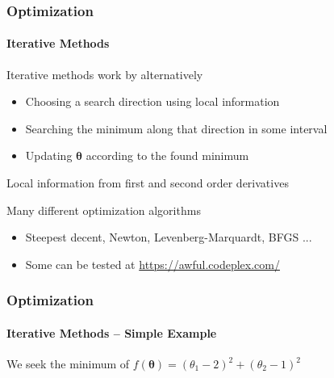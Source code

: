 \documentclass[xetex,professionalfont]{beamer}
\newcommand{\bth}{\boldsymbol{\theta}}
\begin{document}
\begin{frame}
\frametitle{Optimization}
\framesubtitle{Iterative Methods}

Iterative methods work by alternatively
\begin{itemize}
    \item Choosing a search direction using local information
    \item Searching the minimum along that direction in some interval
    \item Updating $\bth$ according to the found minimum
\end{itemize}

\bigskip
Local information from first and second order derivatives %

\bigskip
Many different optimization algorithms
\begin{itemize}
    \item Steepest decent, Newton, Levenberg-Marquardt, BFGS ... %
    \item Some can be tested at \url{https://awful.codeplex.com/}
\end{itemize}

\end{frame}


\begin{frame}[fragile]
\frametitle{Optimization}
\framesubtitle{Iterative Methods -- Simple Example}

We seek the minimum of $f(\bth)=(\theta_1-2)^2+(\theta_2-1)^2$ %

\bigskip
\begin{center}
\end{center}

\end{frame}

\end{document}
